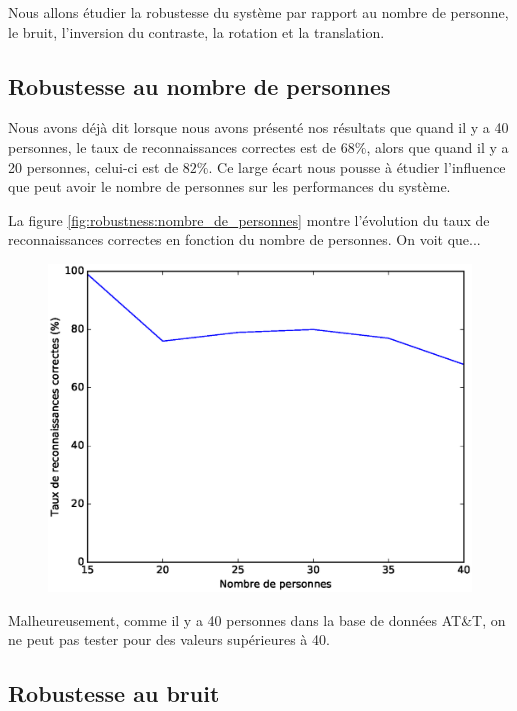 Nous allons étudier la robustesse du système par rapport au nombre de personne,
le bruit, l'inversion du contraste, la rotation et la translation.


\subsection{Robustesse au nombre de personnes}
Nous avons déjà dit lorsque nous avons présenté nos résultats que quand il y a
40 personnes, le taux de reconnaissances correctes est de $68\%$, alors que quand
il y a 20 personnes, celui-ci est de $82\%$. Ce large écart nous pousse à étudier
l'influence que peut avoir le nombre de personnes sur les performances du système.

La figure \ref{fig:robustness:nombre_de_personnes} montre l'évolution du taux
de reconnaissances correctes en fonction du nombre de personnes. On voit que...

\begin{figure}[H]
    \centering
    \includegraphics[scale=0.5]{images/robustesse_nombre_de_personnes}
\end{figure}
Malheureusement, comme il y a 40 personnes dans la base de données AT\&T, on ne 
peut pas tester pour des valeurs supérieures à 40.


\subsection{Robustesse au bruit}

